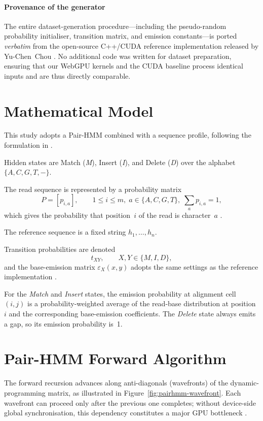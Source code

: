 \documentclass[PhD]{PHlab-thesis}
\begin{document}
\paragraph{Provenance of the generator}%
The entire dataset-generation procedure—including the pseudo-random
probability initialiser, transition matrix, and emission constants—is
ported \emph{verbatim} from the open-source C++/CUDA reference
implementation released by Yu-Chen~Chou \cite{Chou2024-github}.
No additional code was written for dataset preparation, ensuring that our
WebGPU kernels and the CUDA baseline process identical inputs and are thus
directly comparable.

\section{Mathematical Model}
This study adopts a Pair-HMM combined with a sequence profile, following
the formulation in \cite{Durbin1998}.

Hidden states are Match (\textit{M}), Insert (\textit{I}), and Delete
(\textit{D}) over the alphabet $\{A,C,G,T,-\}$.

The read sequence is represented by a probability matrix
\[
P=[p_{i,a}],\qquad
1\le i\le m,\;
a\in\{A,C,G,T\},\;
\sum_{a}p_{i,a}=1,
\]
which gives the probability that position~$i$ of the read is character~$a$
\cite{Chou2024-github}.

The reference sequence is a fixed string $h_{1},\dots,h_{n}$.

Transition probabilities are denoted
\[
t_{XY},\qquad X,Y\in\{M,I,D\},
\]
and the base-emission matrix $\varepsilon_{X}(x,y)$ adopts the same
settings as the reference implementation \cite{Durbin1998}.

For the \emph{Match} and \emph{Insert} states, the emission probability at
alignment cell~$(i,j)$ is a probability-weighted average of the read-base
distribution at position~$i$ and the corresponding base-emission
coefficients.
The \emph{Delete} state always emits a gap, so its emission probability is~1.

\section{Pair-HMM Forward Algorithm}
The forward recursion advances along anti-diagonals (wavefronts) of the
dynamic-programming matrix, as illustrated in
Figure~\ref{fig:pairhmm-wavefront}.
Each wavefront can proceed only after the previous one completes; without
device-side global synchronisation, this dependency constitutes a major
GPU bottleneck \cite{Chou2024-github}.
\end{document}
